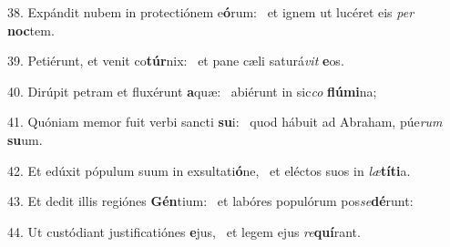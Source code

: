 38. Expándit nubem in protectiónem e\textbf{ó}rum: \ast\  et ignem ut lucéret eis \textit{per} \textbf{noc}tem.\

39. Petiérunt, et venit co\textbf{túr}nix: \ast\  et pane cæli saturá\textit{vit} \textbf{e}os.\

40. Dirúpit petram et fluxérunt \textbf{a}quæ: \ast\  abiérunt in sic\textit{co} \textbf{flú}\textbf{mi}na;\

41. Quóniam memor fuit verbi sancti \textbf{su}i: \ast\  quod hábuit ad Abraham, púe\textit{rum} \textbf{su}um.\

42. Et edúxit pópulum suum in exsultati\textbf{ó}ne, \ast\  et eléctos suos in \textit{læ}\textbf{tí}\textbf{ti}a.\

43. Et dedit illis regiónes \textbf{Gén}tium: \ast\  et labóres populórum pos\textit{se}\textbf{dé}runt:\

44. Ut custódiant justificatiónes \textbf{e}jus, \ast\  et legem ejus \textit{re}\textbf{quí}rant.\

